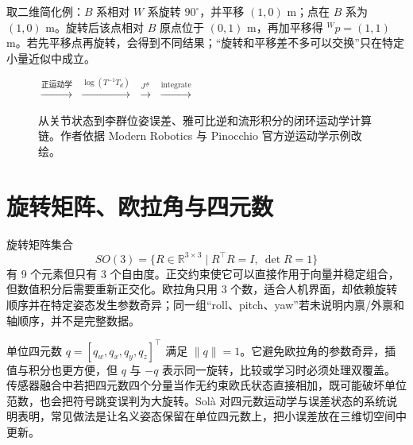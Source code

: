 取二维简化例：$B$ 系相对 $W$ 系旋转 $90^\circ$，并平移 $(1,0)$ m；点在 $B$ 系为 $(1,0)$ m。旋转后该点相对 $B$ 原点位于 $(0,1)$ m，再加平移得 ${}^{W}p=(1,1)$ m。若先平移点再旋转，会得到不同结果；“旋转和平移差不多可以交换”只在特定小量近似中成立。

\begin{figure}[H]
\centering
\small
{}
$\xrightarrow{\text{正运动学}}$
$\xrightarrow{\log(T^{-1}T_d)}$
$\xrightarrow{J^\#}$
$\xrightarrow{\operatorname{integrate}}$
\caption{从关节状态到李群位姿误差、雅可比逆和流形积分的闭环运动学计算链。作者依据 Modern Robotics 与 Pinocchio 官方逆运动学示例改绘\cite{lynch2017modern,pinocchio340ik}。}
\label{fig:kinematic-compute-chain}
\end{figure}

\section{旋转矩阵、欧拉角与四元数}

旋转矩阵集合
\begin{equation}
SO(3)=\{R\in\mathbb{R}^{3\times3}\mid R^\top R=I,\ \det R=1\}
\label{eq:so3-definition}
\end{equation}
有 9 个元素但只有 3 个自由度。正交约束使它可以直接作用于向量并稳定组合，但数值积分后需要重新正交化。欧拉角只用 3 个数，适合人机界面，却依赖旋转顺序并在特定姿态发生参数奇异；同一组“roll、pitch、yaw”若未说明内禀/外禀和轴顺序，并不是完整数据。

单位四元数 $q=[q_w,q_x,q_y,q_z]^\top$ 满足 $\lVert q\rVert=1$。它避免欧拉角的参数奇异，插值与积分也更方便，但 $q$ 与 $-q$ 表示同一旋转，比较或学习时必须处理双覆盖。传感器融合中若把四元数四个分量当作无约束欧氏状态直接相加，既可能破坏单位范数，也会把符号跳变误判为大旋转。Solà 对四元数运动学与误差状态的系统说明表明，常见做法是让名义姿态保留在单位四元数上，把小误差放在三维切空间中更新\cite{sola2017quaternion}。

